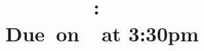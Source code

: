\documentclass{article}
\title{
    \vspace{2in}
    \textmd{\textbf{\hmwkClass:\ \hmwkTitle}}\\
    \normalsize\vspace{0.1in}\small{Due\ on\ \hmwkDueDate\ at 3:30pm}\\
    \vspace{0.1in}\large{\textit{\hmwkClassInstructor\ \hmwkClassTime}}
    \vspace{3in}
}
\author{\hmwkAuthorName}
\date{}
\newcommand{\enterProblemHeader}[1]{
    \nobreak\extramarks{}{Problem \arabic{#1} continued on next page\ldots}\nobreak{}
    \nobreak\extramarks{Problem \arabic{#1} (continued)}{Problem \arabic{#1} continued on next page\ldots}\nobreak{}
}
\newcommand{\exitProblemHeader}[1]{
    \nobreak\extramarks{Problem \arabic{#1} (continued)}{Problem \arabic{#1} continued on next page\ldots}\nobreak{}
    \stepcounter{#1}
    \nobreak\extramarks{Problem \arabic{#1}}{}\nobreak{}
}
\newcounter{partCounter}
\newcounter{homeworkProblemCounter}
\newenvironment{homeworkProblem}[1][-1]{
    \ifnum#1>0
        \setcounter{homeworkProblemCounter}{#1}
    \fi
    \section{Problem \arabic{homeworkProblemCounter}}
    \setcounter{partCounter}{1}
    \enterProblemHeader{homeworkProblemCounter}
}{
    \exitProblemHeader{homeworkProblemCounter}
}
\begin{document}
\maketitle

\pagebreak

%
%
%
%
%
%
%
%
%
%
%
\end{document}
